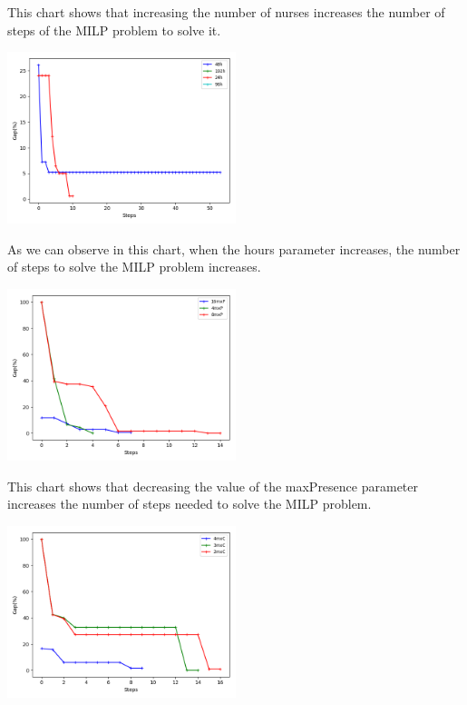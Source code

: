 This chart shows that increasing the number of nurses increases the number of steps of the MILP problem to solve it.

\begin{center}
\includegraphics[width=0.5\textwidth]{./img/instances_hours_ilp_evol.png}\\[0.4cm] 
\end{center}

As we can observe in this chart, when the hours parameter increases, the number of steps to solve the MILP problem increases.


\begin{center}
\includegraphics[width=0.5\textwidth]{./img/instances_maxpresence_ilp_evol.png}
\end{center}

This chart shows that decreasing the value of the maxPresence parameter increases the number of steps needed to solve the MILP problem.


\begin{center}
\includegraphics[width=0.5\textwidth]{./img/instances_maxconsec_ilp_evol.png}
\end{center}

